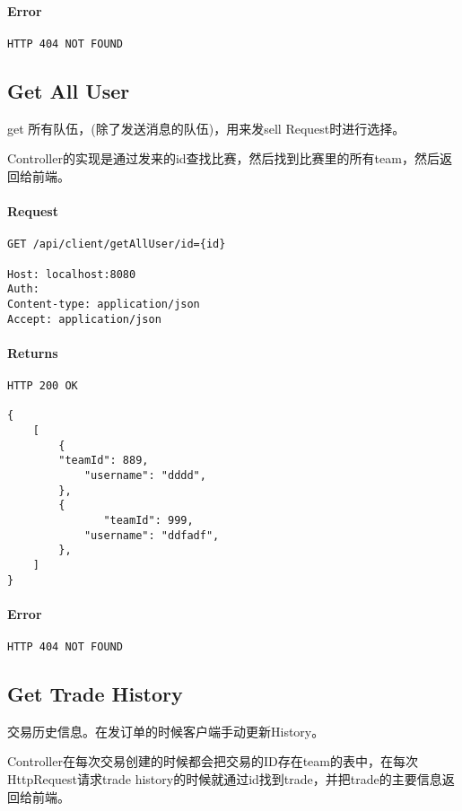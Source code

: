 \documentclass{article}
\begin{document}
				\paragraph*{Error}
\begin{lstlisting}
HTTP 404 NOT FOUND
\end{lstlisting}

			\subsection{Get All User}
				get 所有队伍，(除了发送消息的队伍)，用来发sell Request时进行选择。

                Controller的实现是通过发来的id查找比赛，然后找到比赛里的所有team，然后返回给前端。
					\paragraph*{Request}
\begin{lstlisting}
GET /api/client/getAllUser/id={id}

Host: localhost:8080
Auth:
Content-type: application/json
Accept: application/json

\end{lstlisting}
					\paragraph*{Returns}
\begin{lstlisting}
HTTP 200 OK

{
    [
        {
        "teamId": 889,
            "username": "dddd",
        },
        {
               "teamId": 999,
            "username": "ddfadf",
        },
    ]
}
\end{lstlisting}
					\paragraph*{Error}
\begin{lstlisting}
HTTP 404 NOT FOUND
\end{lstlisting}

				\subsection{Get Trade History}
					交易历史信息。在发订单的时候客户端手动更新History。

                    Controller在每次交易创建的时候都会把交易的ID存在team的表中，在每次HttpRequest请求trade history的时候就通过id找到trade，并把trade的主要信息返回给前端。
\end{document}
